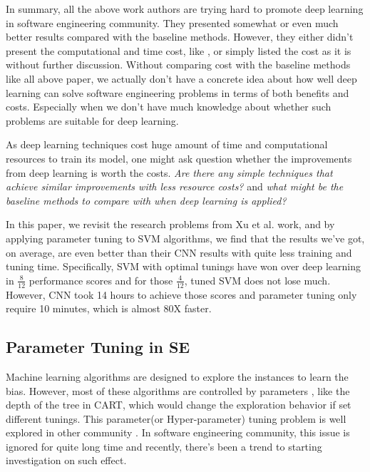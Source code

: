 \documentclass[sigconf,review, anonymous]{acmart}
\theoremstyle{break}
\begin{document}
 In summary, all the above work authors are trying hard to promote deep learning in software
 engineering community. They presented somewhat or even much better results compared with
 the baseline methods. However, they either didn't present the computational and time cost, like \cite{white2016deep,white2015toward,lam2015combining,choetkiertikul2016deep}, or simply listed
 the cost as it is without further discussion\cite{wang2016automatically, gu2016deep, xu2016predicting}. Without comparing cost with the baseline methods like all above paper,
 we actually don't have a concrete idea about how well deep learning can solve software engineering problems in terms of both benefits and costs. Especially when we don't have much knowledge about
 whether such problems are suitable for deep learning. 
 
As deep learning techniques cost huge amount of time and computational
resources to train its model,
one might ask question whether the improvements from deep learning is worth
the costs. {\it Are there any simple techniques that achieve similar improvements
with less resource costs?} and {\it what might be the baseline methods to compare with
when deep learning is applied?}

In this paper, we revisit the research problems 
from Xu et al.\cite{xu2016predicting} work, and by applying parameter tuning 
to SVM algorithms, we find that the results we've got, on average, are even 
better than their CNN results with quite less training and tuning time.
Specifically, SVM with optimal tunings have won over deep learning 
in $\frac{8}{12}$ performance scores and for those $\frac{4}{12}$,
tuned SVM  does not lose much. However, CNN took 14 hours to achieve
those scores and parameter tuning only require 10 minutes, which is almost 80X faster.




\subsection{Parameter Tuning in SE}
Machine learning algorithms are designed to explore the instances
to learn the bias. However, most of these algorithms are controlled by parameters
, like the depth of the tree in CART, which would change the
exploration behavior if set different tunings. This parameter(or Hyper-parameter)
tuning problem is well explored in other community \cite{bergstra2012random,li2016hyperband}.
In software engineering community, this issue is ignored for quite
long time and recently, there's been a trend to starting investigation on such effect.
\end{document}
